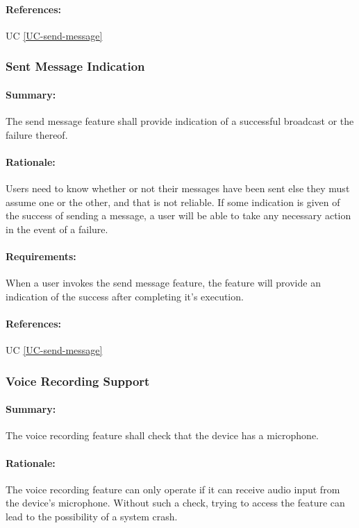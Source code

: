 \documentclass[11pt]{article}
\begin{document}
\paragraph{References:} UC \ref{UC-send-message}

\subsubsection{Sent Message Indication} \label{FR-send-message-indicator}
\paragraph{Summary:} The send message feature shall provide indication of a successful broadcast or the failure thereof.
\paragraph{Rationale:} Users need to know whether or not their messages have been sent else they must assume one or the other, and that is not reliable. If some indication is given of the success of sending a message, a user will be able to take any necessary action in the event of a failure.
\paragraph{Requirements:} When a user invokes the send message feature, the feature will provide an indication of the success after completing it's execution.
\paragraph{References:} UC \ref{UC-send-message}

\subsubsection{Voice Recording Support} \label{FR-voice-record-support}
\paragraph{Summary:} The voice recording feature shall check that the device has a microphone.
\paragraph{Rationale:} The voice recording feature can only operate if it can receive audio input from the device's microphone. Without such a check, trying to access the feature can lead to the possibility of a system crash.
\end{document}
